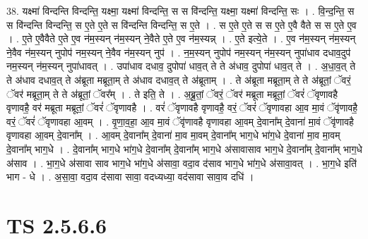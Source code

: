\documentclass[17pt]{extarticle}
\begin{document}
38. यक्ष्मा॑ विन्दन्ति विन्दन्ति॒ यक्ष्मा॒ यक्ष्मा॑ विन्दन्ति॒ स स वि॑न्दन्ति॒ यक्ष्मा॒ यक्ष्मा॑ विन्दन्ति॒ सः । . वि॒न्द॒न्ति॒ स स वि॑न्दन्ति विन्दन्ति॒ स ए॒ते ए॒ते स वि॑न्दन्ति विन्दन्ति॒ स ए॒ते । . स ए॒ते ए॒ते स स ए॒ते ए॒वै वैते स स ए॒ते ए॒व । . ए॒ते ए॒वैवैते ए॒ते ए॒व न॑म॒स्यन् न॑म॒स्यन् ने॒वैते ए॒ते ए॒व न॑म॒स्यन्न् । . ए॒ते इत्ये॒ते । . ए॒व न॑म॒स्यन् न॑म॒स्यन् ने॒वैव न॑म॒स्यन् नुपोप॑ नम॒स्यन् ने॒वैव न॑म॒स्यन् नुप॑ । . न॒म॒स्यन् नुपोप॑ नम॒स्यन् न॑म॒स्यन् नुपा॑धाव दधाव॒दुप॑ नम॒स्यन् न॑म॒स्यन् नुपा॑धावत् । . उपा॑धाव दधाव॒ दुपोपा॑ धाव॒त् ते ते अ॑धाव॒ दुपोपा॑ धाव॒त् ते । . अ॒धा॒व॒त् ते ते अ॑धाव दधाव॒त् ते अ॑ब्रूता मब्रूता॒म् ते अ॑धाव दधाव॒त् ते अ॑ब्रूताम् । . ते अ॑ब्रूता मब्रूता॒म् ते ते अ॑ब्रूतां॒ ॅवरं॒ ॅवर॑ मब्रूता॒म् ते ते अ॑ब्रूतां॒ ॅवर᳚म् । . ते इति॒ ते । . अ॒ब्रू॒तां॒ ॅवरं॒ ॅवर॑ मब्रूता मब्रूतां॒ ॅवरं॑ ॅवृणावहै वृणावहै॒ वर॑ मब्रूता मब्रूतां॒ ॅवरं॑ ॅवृणावहै । . वरं॑ ॅवृणावहै वृणावहै॒ वरं॒ ॅवरं॑ ॅवृणावहा आ॒व मा॒वं ॅवृ॑णावहै॒ वरं॒ ॅवरं॑ ॅवृणावहा आ॒वम् । . वृ॒णा॒व॒हा॒ आ॒व मा॒वं ॅवृ॑णावहै वृणावहा आ॒वम् दे॒वाना᳚म् दे॒वाना॑ मा॒वं ॅवृ॑णावहै वृणावहा आ॒वम् दे॒वाना᳚म् । . आ॒वम् दे॒वाना᳚म् दे॒वाना॑ मा॒व मा॒वम् दे॒वाना᳚म् भाग॒धे भा॑ग॒धे दे॒वाना॑ मा॒व मा॒वम् दे॒वाना᳚म् भाग॒धे । . दे॒वाना᳚म् भाग॒धे भा॑ग॒धे दे॒वाना᳚म् दे॒वाना᳚म् भाग॒धे अ॑सावासाव भाग॒धे दे॒वाना᳚म् दे॒वाना᳚म् भाग॒धे अ॑साव । . भा॒ग॒धे अ॑सावा साव भाग॒धे भा॑ग॒धे अ॑सावा॒ वदा॒व द॑साव भाग॒धे भा॑ग॒धे अ॑सावा॒वत् । . भा॒ग॒धे इति॑ भाग - धे । . अ॒सा॒वा॒ वदा॒व द॑सावा सावा॒ वदध्यध्या॒ वद॑सावा सावा॒व दधि॑ । \newline
\pagebreak
{}
\section*{ TS 2.5.6.6 }
\end{document}
